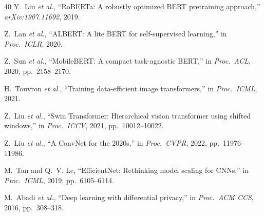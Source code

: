 \documentclass[conference]{IEEEtran}
\begin{document}
\begin{thebibliography}{40}
Y.~Liu \emph{et al.},
``RoBERTa: A robustly optimized BERT pretraining approach,''
\emph{arXiv:1907.11692}, 2019.

Z.~Lan \emph{et al.},
``ALBERT: A lite BERT for self-supervised learning,''
in \emph{Proc.\ ICLR}, 2020.

Z.~Sun \emph{et al.},
``MobileBERT: A compact task-agnostic BERT,''
in \emph{Proc.\ ACL}, 2020, pp.\ 2158--2170.

H.~Touvron \emph{et al.},
``Training data-efficient image transformers,''
in \emph{Proc.\ ICML}, 2021.

Z.~Liu \emph{et al.},
``Swin Transformer: Hierarchical vision transformer using shifted windows,''
in \emph{Proc.\ ICCV}, 2021, pp.\ 10012--10022.

Z.~Liu \emph{et al.},
``A ConvNet for the 2020s,''
in \emph{Proc.\ CVPR}, 2022, pp.\ 11976--11986.

M.~Tan and Q.~V. Le,
``EfficientNet: Rethinking model scaling for CNNs,''
in \emph{Proc.\ ICML}, 2019, pp.\ 6105--6114.

M.~Abadi \emph{et al.},
``Deep learning with differential privacy,''
in \emph{Proc.\ ACM CCS}, 2016, pp.\ 308--318.

\end{thebibliography}
\end{document}
